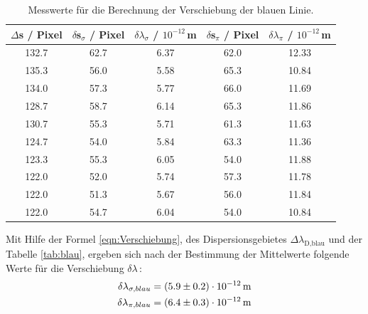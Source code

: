 \begin{table}[H]
  \centering
  \caption{Messwerte für die Berechnung der Verschiebung der blauen Linie.}
  \label{tab:blau}
  \begin{tabular}{c | c c | c c}
    $\Delta$s / Pixel & $\delta$s$_{\sigma}$ / Pixel & $\delta \lambda_{\sigma}$ / $10^{-12}$\,m & $\delta$s$_{\pi}$ / Pixel & $\delta \lambda_{\pi}$ / $10^{-12}$\,m \\
    \hline
    132.7 & 62.7 & 6.37 & 62.0 & 12.33 \\
    135.3 & 56.0 & 5.58 & 65.3 & 10.84 \\
    134.0 & 57.3 & 5.77 & 66.0 & 11.69 \\
    128.7 & 58.7 & 6.14 & 65.3 & 11.86 \\
    130.7 & 55.3 & 5.71 & 61.3 & 11.63 \\
    124.7 & 54.0 & 5.84 & 63.3 & 11.36 \\
    123.3 & 55.3 & 6.05 & 54.0 & 11.88 \\
    122.0 & 52.0 & 5.74 & 57.3 & 11.78 \\
    122.0 & 51.3 & 5.67 & 56.0 & 11.84 \\
    122.0 & 54.7 & 6.04 & 54.0 & 10.84 \\
    \hline
  \end{tabular}
\end{table}

Mit Hilfe der Formel \eqref{eqn:Verschiebung}, des Dispersionsgebietes $\Delta\lambda_\text{D,blau}$ und der Tabelle \eqref{tab:blau}, ergeben sich nach der Bestimmung der Mittelwerte folgende Werte für die Verschiebung $\delta\lambda$\,:
\begin{align*}
  \delta \lambda_{\sigma,blau} = (\num{5.9 +- 0.2})\cdot 10^{-12}\,\text{m} \\
  \delta \lambda_{\pi,blau} = (\num{6.4 +- 0.3})\cdot 10^{-12}\,\text{m}
\end{align*}



